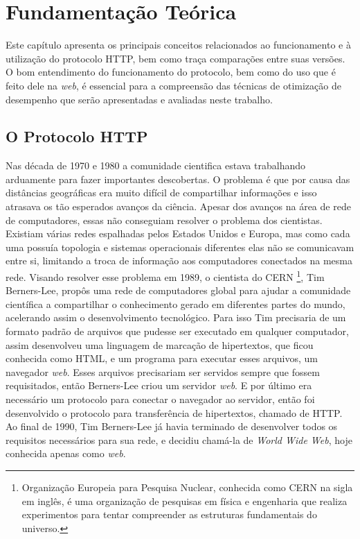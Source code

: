 %
%

\chapter{Fundamentação Teórica}
\label{chap:fundamentacaoTeorica}

Este capítulo apresenta os principais conceitos relacionados ao funcionamento e à utilização do protocolo HTTP, bem como traça comparações entre suas versões. O bom entendimento do funcionamento do protocolo, bem como do uso que é feito dele na \textit{web}, é essencial para a compreensão das técnicas de otimização de desempenho que serão apresentadas e avaliadas neste trabalho.

\section{O Protocolo HTTP}
\label{sec:http}

Nas década de 1970 e 1980 a comunidade cientifica estava trabalhando arduamente para fazer importantes descobertas. O problema é que por causa das distâncias geográficas era muito difícil de compartilhar informações e isso atrasava os tão esperados avanços da ciência. Apesar dos avanços na área de rede de computadores, essas não conseguiam resolver o problema dos cientistas. Existiam várias redes espalhadas pelos Estados Unidos e Europa, mas como cada uma possuía topologia e sistemas operacionais diferentes elas não se comunicavam entre si, limitando a troca de informação aos computadores conectados na mesma rede. Visando resolver esse problema em 1989, o cientista do CERN \footnote{Organização Europeia para Pesquisa Nuclear, conhecida como CERN na sigla em inglês, é uma organização de pesquisas em física e engenharia que realiza experimentos para tentar compreender as estruturas fundamentais do universo.}, Tim Berners-Lee, propôs uma rede de computadores global para ajudar a comunidade científica a compartilhar o conhecimento gerado em diferentes partes do mundo, acelerando assim o desenvolvimento tecnológico. Para isso Tim precisaria de um formato padrão de arquivos que pudesse ser executado em qualquer computador, assim desenvolveu uma linguagem de marcação de hipertextos,  que ficou conhecida como HTML, e um programa para executar esses arquivos, um navegador \textit{web}. Esses arquivos precisariam ser servidos sempre que fossem requisitados, então Berners-Lee criou um servidor \textit{web}. E por último era necessário um protocolo para conectar o navegador ao servidor, então foi desenvolvido o protocolo para transferência de hipertextos, chamado de HTTP. Ao final de 1990, Tim Berners-Lee já havia terminado de desenvolver todos os requisitos necessários para sua rede, e decidiu chamá-la de \textit{World Wide Web}, hoje conhecida apenas como \textit{web}.

